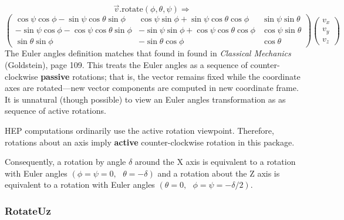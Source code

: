 \[  \vec{v}.\mbox{rotate}(\phi, \theta, \psi) \Longrightarrow  \]
\begin{equation}
\label{eq:eulerrot}
\left(
\begin{array}{ccc}
\cos \psi \cos \phi - \sin \psi \cos \theta \sin \phi &
\cos \psi \sin \phi + \sin \psi \cos \theta \cos \phi &
\sin \psi \sin \theta \\
- \sin \psi \cos \phi - \cos \psi \cos \theta \sin \phi &
- \sin \psi \sin \phi + \cos \psi \cos \theta \cos \phi &
\cos \psi \sin \theta \\
\sin \theta \sin \phi &
- \sin \theta \cos \phi &
\cos \theta
\end{array}
\right)
\left(
\begin{array}{c}
v_x\\
v_y\\
v_z
\end{array}
\right)
\end{equation}
\noindent
The Euler angles definition matches that found in found in
{\em Classical Mechanics} (Goldstein), page 109.
This treats the Euler angles as a sequence of counter-clockwise {\bf passive}
rotations;
that is, the vector remains fixed while the coordinate axes are rotated---new
vector components are computed in new coordinate frame.
It is unnatural (though possible) to view an Euler angles transformation as
as sequence of active rotations.

HEP computations ordinarily use the active rotation viewpoint.
Therefore, rotations about an axis imply {\bf active} counter-clockwise
rotation in this package. 

Consequently, a rotation by angle $\delta$ around the X axis is
equivalent to a rotation with Euler angles
$(\phi=\psi=0, \mbox{ } \theta = - \delta)$
and a rotation about the Z axis is
equivalent to a rotation with Euler angles
$(\theta = 0, \mbox{ } \phi=\psi= - \delta/2)$.

\subsubsection{RotateUz}

